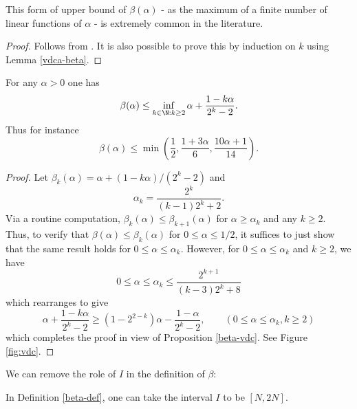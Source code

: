 This form of upper bound of $\beta(\alpha)$ - as the maximum of a finite number of linear functions of $\alpha$ - is extremely common in the literature.

\begin{proof} Follows from \cite[Theorem 8.20]{ik}. It is also possible to prove this by induction on $k$ using Lemma \ref{vdca-beta}.
\end{proof}

    \begin{corollary}\label{vdc-opt}  For any $\alpha > 0$ one has
    $$\beta(\alpha) \leq \inf_{k \in \N: k \geq 2} \alpha + \frac{1-k\alpha}{2^k-2}.$$
    Thus for instance
    $$ \beta(\alpha) \leq \min\left( \frac{1}{2}, \frac{1+3\alpha}{6}, \frac{10\alpha+1}{14}\right).$$
    \end{corollary}

\begin{proof}
Let $\beta_k(\alpha) = \alpha + (1 - k\alpha)/(2^k - 2)$ and
\[
\alpha_k = \frac{2^k}{(k - 1)2^k + 2}.
\]
Via a routine computation, $\beta_k(\alpha) \le \beta_{k+1}(\alpha)$ for $\alpha \ge \alpha_k$ and any $k \ge 2$. Thus, to verify that $\beta(\alpha) \le \beta_k(\alpha)$ for $0 \le \alpha \le 1/2$, it suffices to just show that the same result holds for $0 \le \alpha \le \alpha_{k}$. However, for $0 \le \alpha \le \alpha_k$ and $k \ge 2$, we have
\[
0 \le \alpha \le \alpha_k \le \frac{2^{k + 1}}{(k - 3)2^k + 8}
\]
which rearranges to give
\[
\alpha + \frac{1-k\alpha}{2^k-2}\geq (1 - 2^{2-k})\alpha - \frac{1-\alpha}{2^k-2},\qquad (0 \le \alpha \le \alpha_k, k \ge 2)
\]
which completes the proof in view of Proposition \ref{beta-vdc}.  See Figure \ref{fig:vdc}.
\end{proof}


We can remove the role of $I$ in the definition of $\beta$:

\begin{lemma}\label{interval-set}  In Definition \ref{beta-def}, one can take the interval $I$ to be $[N,2N]$.
\end{lemma}

